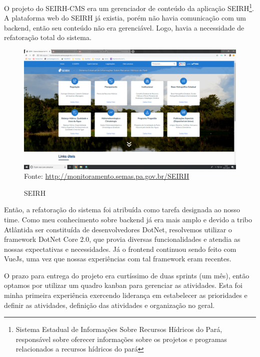 O projeto do SEIRH-CMS era um gerenciador de conteúdo da aplicação SEIRH\footnote{Sistema Estadual de Informações Sobre Recursos Hídricos do Pará, responsável sobre oferecer informações sobre os projetos e programas relacionados a recursos hídricos do pará}.
A plataforma web do SEIRH já existia, porém não havia comunicação com um backend, então seu conteúdo não era gerenciável. Logo, havia a necessidade de refatoração total do sistema.

\begin{figure}[H]
\centering
\caption{SEIRH} %
\includegraphics[scale=0.22]{SEIRH}\\  %
{\small Fonte: \url{http://monitoramento.semas.pa.gov.br/SEIRH}} %
\label{fig:exemplo} %
\end{figure}

Então, a refatoração do sistema foi atribuída como tarefa designada ao nosso time.
Como meu conhecimento sobre backend já era mais amplo e devido a tribo Atlântida ser constituída de desenvolvedores DotNet, resolvemos utilizar o framework DotNet Core 2.0, que 
provia diversas funcionalidades e atendia as nossas expectativas e necessidades.
Já o frontend continuou sendo feito com VueJs, uma vez que nossas experiências com tal framework eram recentes.

O prazo para entrega do projeto era curtíssimo de duas sprints (um mês), então optamos por utilizar um quadro kanban para gerenciar as atividades.
Esta foi minha primeira experiência exercendo liderança em estabelecer as prioridades e definir as atividades, definição das atividades e organização no geral.

